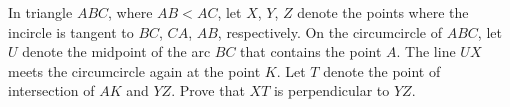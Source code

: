 In triangle $ABC$,  where $AB<AC$,  let $X$,  $Y$,  $Z$ denote the points where the incircle is tangent to $BC$,  $CA$,  $AB$,  respectively. On the circumcircle of $ABC$,  let $U$ denote the midpoint of the arc $BC$ that contains the point $A$. The line $UX$ meets the circumcircle again at the point $K$. Let $T$ denote the point of intersection of $AK$ and $YZ$. Prove that $XT$ is perpendicular to $YZ$.